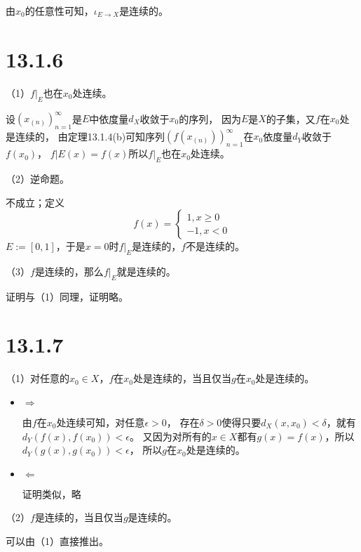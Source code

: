 \documentclass{article}
\begin{document}
由$x_0$的任意性可知，$\iota _{E \to X}$是连续的。

\section*{13.1.6}

（1）$f|_E$也在$x_0$处连续。

设$(x_{(n)})_{n = 1}^\infty$是$E$中依度量$d_X$收敛于$x_0$的序列，
因为$E$是$X$的子集，又$f$在$x_0$处是连续的，
由定理13.1.4(b)可知序列$(f(x_{(n)}))_{n = 1}^\infty$在$x_0$依度量$d_Y$收敛于$f(x_0)$，
$f|E(x) = f(x)$所以$f|_E$也在$x_0$处连续。

（2）逆命题。

不成立；定义
\begin{equation*}
  f(x) = \begin{cases}
    1, x \geq 0 \\
    -1, x < 0
  \end{cases}
\end{equation*}
$E := [0, 1]$，于是$x = 0$时$f|_E$是连续的，$f$不是连续的。

（3）$f$是连续的，那么$f|_E$就是连续的。

证明与（1）同理，证明略。


\section*{13.1.7}

（1）对任意的$x_0 \in X$，$f$在$x_0$处是连续的，当且仅当$g$在$x_0$处是连续的。

\begin{itemize}
  \item $\Rightarrow$

        由$f$在$x_0$处连续可知，对任意$\epsilon > 0$，
        存在$\delta > 0$使得只要$d_X(x, x_0) < \delta$，就有$d_Y(f(x), f(x_0)) < \epsilon$。
        又因为对所有的$x \in X$都有$g(x) = f(x)$，所以$d_Y(g(x), g(x_0)) < \epsilon$，
        所以$g$在$x_0$处是连续的。

  \item $\Leftarrow$

        证明类似，略
\end{itemize}

（2）$f$是连续的，当且仅当$g$是连续的。

可以由（1）直接推出。
\end{document}
